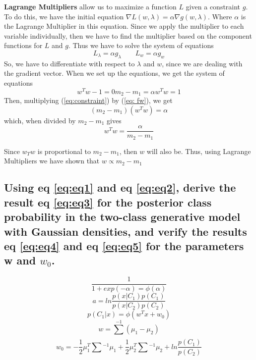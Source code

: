 \documentclass{article}
\begin{document}
		\textbf{Lagrange Multipliers} allow us to maximize a function $L$ given a constraint $g$.
		To do this, we have  the initial equation $\nabla L(w, \lambda) = \alpha \nabla g(w, \lambda)$. Where 
		$\alpha$ is the Lagrange Multiplier in this equation. Since we apply the multiplier to each
		variable individually, then we have to find the multiplier based on the component functions 
		for $L$ and $g$. Thus we have to solve the system of equations 
		\[ L_{\lambda} = \alpha g_{\lambda} \quad\quad L_{w} = \alpha g_{w} \]
		So, we have to differentiate with respect to $\lambda$ and $w$, since we are dealing with the gradient
		vector. When we set up the equations, we get the system of equations
		\begin{subequations}
			\begin{equation}
				w^{T}w -1 = 0
			\end{equation}
			\begin{equation}
				\label{eq: fw}
				m_{2} - m_{1} = \alpha
			\end{equation}
			\begin{equation}
				\label{eq:constraint}
				w^{T}w = 1
			\end{equation}
		\end{subequations}
		Then, multiplying (\ref{eq:constraint}) by (\ref{eq: fw}), we get
		\[(m_{2} - m_{1})(w^{T}w) = \alpha\]
		which, when divided by $m_{2} - m_{1}$ gives 
		\[w^{T}w = \frac{\alpha}{m_{2} - m_{1}}\]

		Since $w_{T}w$ is proportional to $m_{2} - m_{1}$, then $w$ will also be. 
		Thus, using Lagrange Multipliers we have shown that $w \propto m_{2} - m_{1}$ 
	\subsection{Using eq \ref{eq:eq1} and eq \ref{eq:eq2}, derive the result eq \ref{eq:eq3} for the posterior class
		probability in the two-class generative model with Gaussian densities, and verify the
		results eq \ref{eq:eq4} and eq \ref{eq:eq5} for the parameters w and $w_{0}$.}
		\begin{equation}
			\label{eq: eq1}
			\frac{1}{1 + exp(-\alpha) = \phi(\alpha)}
		\end{equation}
		\begin{equation}
			\label{eq: eq2}
			a = ln\frac{p(x|C_{1})p(C_{1})}{p(x|C_{2})p(C_{2})}	
		\end{equation}
		\begin{equation}
			\label{eq: eq3}
			p(C_{1}|x) = \phi(w^{T}x + w_{0})
		\end{equation}
		\begin{equation}
			\label{eq: eq4}
			w = \sum_{}^{-1}(\mu_{1} - \mu_{2})
		\end{equation}
		\begin{equation}
			\label{eq: eq5}
				w_{0} = -\frac{1}{2}\mu^{T}_{1}\sum_{}^{}^{-1}\mu_{1} + \frac{1}{2}\mu_{2}^{T}\sum_{}^{}^{-1}\mu_{2} + ln\frac{p(C_{1})}{p(C_{2})}
		\end{equation}
		
\end{document}
